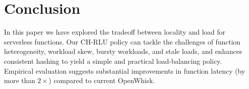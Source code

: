 \vspace*{-0.2cm}
\section{Conclusion}
\vspace*{-0.2cm}
In this paper we have explored the tradeoff between locality and load for serverless functions. 
Our CH-RLU policy can tackle the challenges of function heterogeneity, workload skew, bursty workloads, and stale loads, and enhances consistent hashing to yield a simple and practical load-balancing policy. 
Empirical evaluation suggests substantial improvements in function latency (by more than $2\times$) compared to current OpenWhisk.

